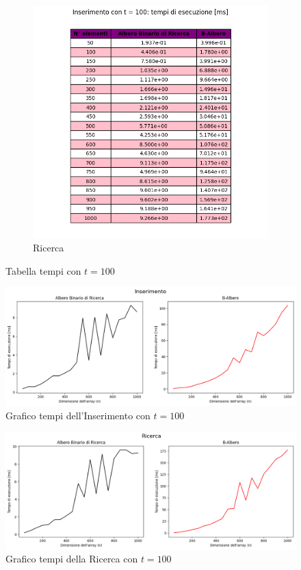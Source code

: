 \begin{figure}[H]
\begin{subfigure}[b]{0.49\textwidth}
        \includegraphics[width=\textwidth]{tables/search-ms-t100.png}
        \caption{Ricerca}
        \label{fig:tablesearchtimet100}
    \end{subfigure}
    \caption{Tabella tempi con $t=100$}
    \label{fig:tabletimest100}
\end{figure}

\begin{figure}[H]
    \centering
    \includegraphics[width=\textwidth]{side-graphs/insert-ms-t100.png}
    \caption{Grafico tempi dell'Inserimento con $t=100$}
        \label{fig:sidegraphinserttimet100}
\end{figure}
    
\begin{figure}[H]
    \centering
    \includegraphics[width=\textwidth]{side-graphs/search-ms-t100.png}
    \caption{Grafico tempi della Ricerca con $t=100$}    \label{fig:sidegraphsearchtimet100}
\end{figure}

